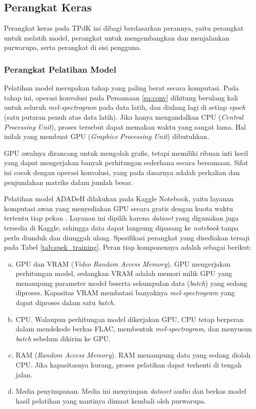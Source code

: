 \subsection{Perangkat Keras}
\label{hardware}

Perangkat keras pada TPdK ini dibagi berdasarkan perannya, yaitu perangkat untuk melatih model, perangkat untuk mengembangkan dan menjalankan purwarupa, serta perangkat di sisi pengguna.

\subsubsection{Perangkat Pelatihan Model}
\label{hw_training}

Pelatihan model merupakan tahap yang paling berat secara komputasi. Pada tahap ini, operasi konvolusi pada Persamaan \ref{eq:conv} dihitung berulang kali untuk seluruh \textit{mel-spectrogram} pada data latih, dan diulang lagi di setiap \textit{epoch} (satu putaran penuh atas data latih). Jika hanya mengandalkan CPU (\textit{Central Processing Unit}), proses tersebut dapat memakan waktu yang sangat lama. Hal inilah yang membuat GPU (\textit{Graphics Processing Unit}) dibutuhkan.

GPU awalnya dirancang untuk mengolah grafis, tetapi memiliki ribuan inti kecil yang dapat mengerjakan banyak perhitungan sederhana secara bersamaan. Sifat ini cocok dengan operasi konvolusi, yang pada dasarnya adalah perkalian dan penjumlahan matriks dalam jumlah besar.

Pelatihan model ADADeH dilakukan pada Kaggle Notebook, yaitu layanan komputasi awan yang menyediakan GPU secara gratis dengan kuota waktu tertentu tiap pekan \autocite{kaggle2026notebooks}. Layanan ini dipilih karena \textit{dataset} yang digunakan juga tersedia di Kaggle, sehingga data dapat langsung dipasang ke \textit{notebook} tanpa perlu diunduh dan diunggah ulang. Spesifikasi perangkat yang disediakan tersaji pada Tabel \ref{tab:spek_training}. Peran tiap komponennya adalah sebagai berikut:
\begin{enumerate}[(a).]
  \item GPU dan VRAM (\textit{Video Random Access Memory}). GPU mengerjakan perhitungan model, sedangkan VRAM adalah memori milik GPU yang menampung parameter model beserta sekumpulan data (\textit{batch}) yang sedang diproses. Kapasitas VRAM membatasi banyaknya \textit{mel-spectrogram} yang dapat diproses dalam satu \textit{batch}.
  \item CPU. Walaupun perhitungan model dikerjakan GPU, CPU tetap berperan dalam mendekode berkas FLAC, membentuk \textit{mel-spectrogram}, dan menyusun \textit{batch} sebelum dikirim ke GPU.
  \item RAM (\textit{Random Access Memory}). RAM menampung data yang sedang diolah CPU. Jika kapasitasnya kurang, proses pelatihan dapat terhenti di tengah jalan.
  \item Media penyimpanan. Media ini menyimpan \textit{dataset} audio dan berkas model hasil pelatihan yang nantinya dimuat kembali oleh purwarupa.
\end{enumerate}

